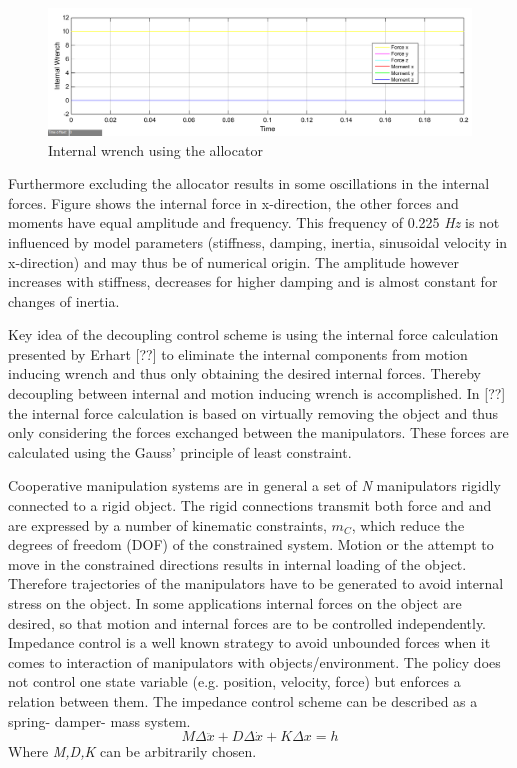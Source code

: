 \documentclass[conference]{IEEEtran}
\begin{document}
\begin{figure}
\includegraphics[width=\linewidth]{IntForceStepAllocator}
\caption{Internal wrench using the allocator}
\label{IntForceAllocator}
\end{figure}
Furthermore excluding the allocator results in some oscillations in the internal forces. Figure shows the internal force in x-direction, the other forces and moments have equal amplitude and frequency. This frequency of 0.225 \textit{Hz} is not influenced by model parameters (stiffness, damping, inertia, sinusoidal velocity in x-direction) and may thus be of numerical origin. The amplitude however increases with stiffness, decreases for higher damping and is almost constant for changes of inertia.




Key idea of the decoupling control scheme is using the internal force calculation presented by Erhart [??] to eliminate the internal components from motion inducing wrench and thus only obtaining the desired internal forces. Thereby decoupling between internal and motion inducing wrench is accomplished. In [??] the internal force calculation is based on virtually removing the object and thus only considering the forces exchanged between the manipulators. These forces are calculated using the Gauss' principle of least constraint. 

Cooperative manipulation systems are in general a set of \textit{N} manipulators rigidly connected to a rigid object. The rigid connections transmit both force and and are expressed by a number of kinematic constraints, \textit{$ m_{C} $}, which reduce the degrees of freedom (DOF) of the constrained system. Motion or the attempt to move in the constrained directions results in internal loading of the object. Therefore trajectories of the manipulators have to be generated to avoid internal stress on the object. In some applications internal forces on the object are desired, so that motion and internal forces are to be controlled independently.
Impedance control is a well known strategy to avoid unbounded forces when it comes to interaction of manipulators with objects/environment. The policy does not control one state variable (e.g. position, velocity, force) but enforces a relation between them. The impedance control scheme can be described as a spring- damper- mass system.
\begin{equation}
M\Delta\ddot{x} + D\Delta\dot{x} + K\Delta x = h
\end{equation}
Where \textit{M,D,K} can be arbitrarily chosen.
\end{document}
